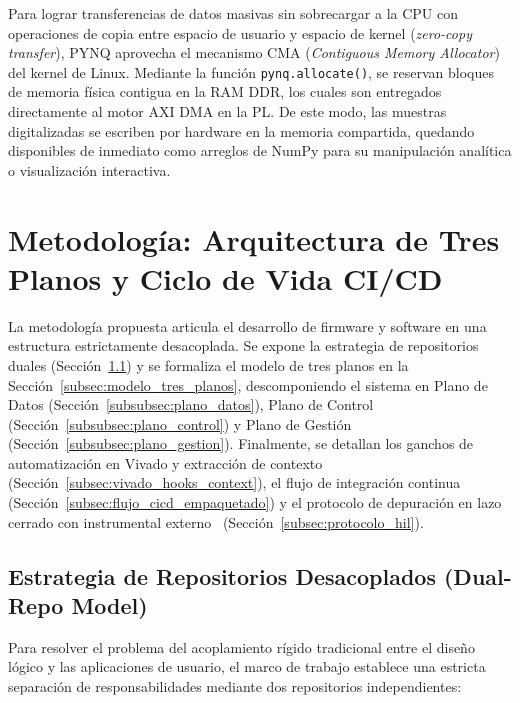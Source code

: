 \documentclass[standalone]{subfiles}
\begin{document}
Para lograr transferencias de datos masivas sin sobrecargar a la CPU con operaciones de copia entre espacio de usuario y espacio de kernel (\textit{zero-copy transfer}), PYNQ aprovecha el mecanismo CMA (\textit{Contiguous Memory Allocator}) del kernel de Linux. Mediante la función \texttt{pynq.allocate()}, se reservan bloques de memoria física contigua en la RAM DDR, los cuales son entregados directamente al motor AXI DMA en la PL. De este modo, las muestras digitalizadas se escriben por hardware en la memoria compartida, quedando disponibles de inmediato como arreglos de NumPy para su manipulación analítica o visualización interactiva.

\section{Metodología: Arquitectura de Tres Planos y Ciclo de Vida CI/CD}
\label{sec:metodologia_framework}

La metodología propuesta articula el desarrollo de firmware y software en una estructura estrictamente desacoplada. Se expone la estrategia de repositorios duales (Sección~\ref{subsec:metodologia_dual_repo}) y se formaliza el modelo de tres planos en la Sección~\ref{subsec:modelo_tres_planos}, descomponiendo el sistema en Plano de Datos (Sección~\ref{subsubsec:plano_datos}), Plano de Control (Sección~\ref{subsubsec:plano_control}) y Plano de Gestión (Sección~\ref{subsubsec:plano_gestion}). Finalmente, se detallan los ganchos de automatización en Vivado y extracción de contexto (Sección~\ref{subsec:vivado_hooks_context}), el flujo de integración continua (Sección~\ref{subsec:flujo_cicd_empaquetado}) y el protocolo de depuración en lazo cerrado con instrumental externo~\cite{digilent_waveforms_sdk} (Sección~\ref{subsec:protocolo_hil}).

\subsection{Estrategia de Repositorios Desacoplados (Dual-Repo Model)}
\label{subsec:metodologia_dual_repo}

Para resolver el problema del acoplamiento rígido tradicional entre el diseño lógico y las aplicaciones de usuario, el marco de trabajo establece una estricta separación de responsabilidades mediante dos repositorios independientes:
\end{document}

